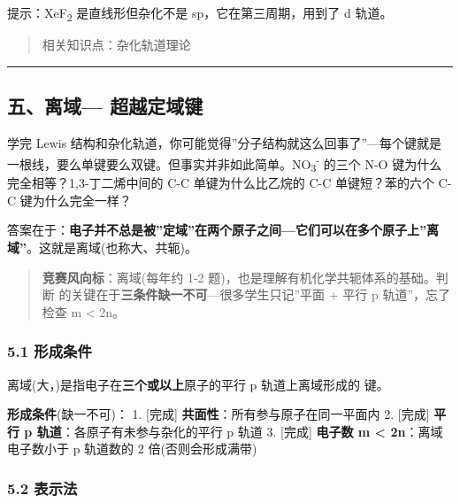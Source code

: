 提示：XeF\textsubscript{2} 是直线形但杂化不是 sp，它在第三周期，用到了 d 轨道。

\begin{quote}
相关知识点：杂化轨道理论
\end{quote}

\begin{center}\rule{0.5\linewidth}{0.5pt}\end{center}

\subsection{\texorpdfstring{五、离域 --- 超越定域键}{五、离域--- 超越定域键}}\label{ux4e94ux79bbux57df-ux8d85ux8d8aux5b9aux57dfux952e}

学完 Lewis 结构和杂化轨道，你可能觉得''分子结构就这么回事了''---每个键就是一根线，要么单键要么双键。但事实并非如此简单。NO\textsubscript{3}\textsuperscript{-} 的三个 N-O 键为什么完全相等？1,3-丁二烯中间的 C-C 单键为什么比乙烷的 C-C 单键短？苯的六个 C-C 键为什么完全一样？

答案在于：\textbf{电子并不总是被''定域''在两个原子之间---它们可以在多个原子上''离域''}。这就是离域(也称大、共轭)。

\begin{quote}
\textbf{竞赛风向标}：离域(每年约 1-2 题)，也是理解有机化学共轭体系的基础。判断  的关键在于\textbf{三条件缺一不可}---很多学生只记''平面 + 平行 p 轨道''，忘了检查 m \textless{} 2n。
\end{quote}

\subsubsection{5.1 形成条件}\label{ux5f62ux6210ux6761ux4ef6}

离域(大，)是指电子在\textbf{三个或以上}原子的平行 p 轨道上离域形成的 \派 键。

\textbf{形成条件}(缺一不可)：
1. {[}完成{]} \textbf{共面性}：所有参与原子在同一平面内
2. {[}完成{]} \textbf{平行 p 轨道}：各原子有未参与杂化的平行 p 轨道
3. {[}完成{]} \textbf{电子数 m \textless{} 2n}：离域电子数小于 p 轨道数的 2 倍(否则会形成满带)

\subsubsection{\texorpdfstring{5.2  表示法}{5.2 表示法}}\label{ux8868ux793aux6cd5}

